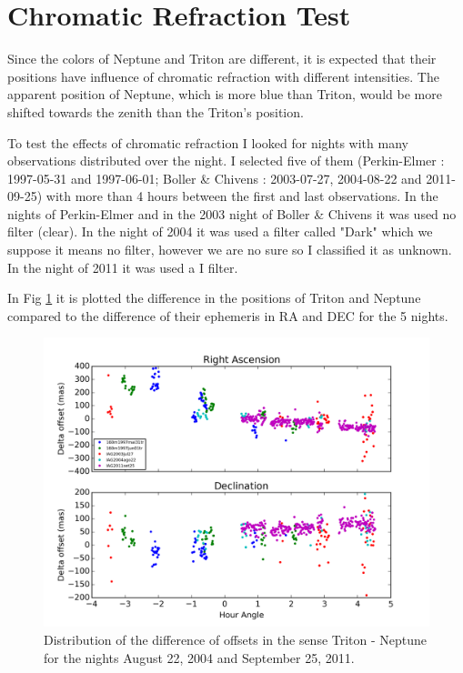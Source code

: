 \documentclass[12pt,a4paper]{report}
\newcommand{\PE}{Perkin-Elmer }
\newcommand{\BC}{Boller \& Chivens }
\begin{document}
\section*{Chromatic Refraction Test}

Since the colors of Neptune and Triton are different, it is expected that their positions have influence of chromatic refraction with different intensities. The apparent position of Neptune, which is more blue than Triton, would be more shifted towards the zenith than the Triton's position.

To test the effects of chromatic refraction I looked for nights with many observations distributed over the night. I selected five of them (\PE: 1997-05-31 and 1997-06-01; \BC: 2003-07-27, 2004-08-22 and 2011-09-25) with more than 4 hours between the first and last observations. In the nights of \PE and in the 2003 night of \BC it was used no filter (clear). In the night of 2004 it was used a filter called "Dark" which we suppose it means no filter, however we are no sure so I classified it as unknown. In the night of 2011 it was used a I filter.%

In Fig \ref{Fig:refraction} it is plotted the difference in the positions of Triton and Neptune compared to the difference of their ephemeris in RA and DEC for the 5 nights.

\begin{figure}[h]
\includegraphics[width=16.0cm]{plot_hour.png} 
\caption{Distribution of the difference of offsets in the sense Triton - Neptune for the nights August 22, 2004 and September 25, 2011.}
\label{Fig:refraction}
\end{figure}
\end{document}
